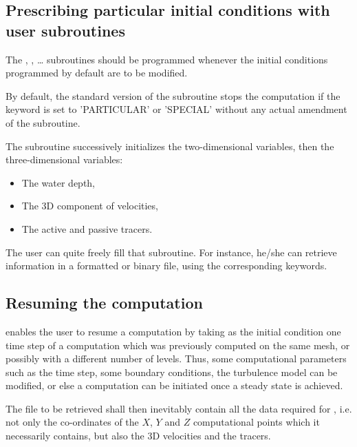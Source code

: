 \subsection{Prescribing particular initial conditions with user subroutines}
\label{sec:prescr_IC}

The , ,
\ldots
subroutines should be programmed whenever the initial
conditions programmed by default are to be modified.

By default, the standard version of the  subroutine
stops the computation if the keyword  is set to
'PARTICULAR' or 'SPECIAL' without any actual amendment of the subroutine.

The  subroutine successively initializes the two-dimensional
variables, then the three-dimensional variables:

\begin{itemize}
\item The water depth,

\item The 3D component of velocities,

\item The active and passive tracers.
\end{itemize}

The user can quite freely fill that subroutine. For instance, he/she can
retrieve information in a formatted or binary file, using the corresponding
keywords.


\subsection{Resuming the computation}

 enables the user to resume a computation by taking as the initial
condition one time step of a computation which was previously computed on
the same mesh, or possibly with a different number of levels. Thus, some
computational parameters such as the time step, some boundary conditions, the
turbulence model can be modified, or else a computation can be initiated once a
steady state is achieved.

The file to be retrieved shall then inevitably contain all the data required
for , i.e. not only the co-ordinates of the $X$, $Y$
and $Z$ computational points which it necessarily contains, but also the
3D velocities and the tracers.

